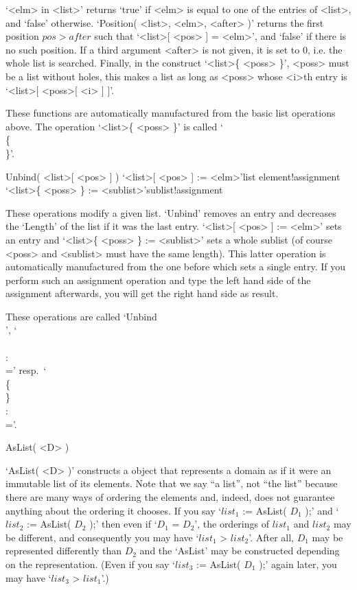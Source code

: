 `<elm> in <list>' returns `true' if <elm> is equal to  one of the entries
of  <list>, and `false'  otherwise. `Position( <list>,  <elm>, <after> )'
returns the first position $pos  > after$  such  that `<list>[ <pos> ]  =
<elm>', and `false' if  there is no  such  position. If a third  argument
<after> is  not given, it is  set to 0, i.e.  the whole list is searched.
Finally, in  the construct `<list>\{  <poss> \}',  <poss> must  be a list
without holes, this makes a  list as long as <poss>  whose <i>th entry is
`<list>[ <poss>[ <i> ] ]'.

These  functions  are automatically  manufactured    from the basic  list
operations   above.  The  operation  `<list>\{    <poss>  \}' is   called
`\\\{\\\}'.

\>Unbind( <list>[ <pos> ] )
\>`<list>[ <pos> ] := <elm>'{list element!assignment}
\>`<list>\{ <poss> \} := <sublist>'{sublist!assignment}

These   operations modify a  given  list.  `Unbind'  removes an entry and
decreases  the `Length' of the list  if it was  the  last entry. `<list>[
<pos> ]  := <elm>' sets an  entry  and `<list>\{ <poss> \}  := <sublist>'
sets a whole sublist  (of course <poss> and <sublist>  must have the same
length). This latter operation is automatically manufactured from the one
before  which sets a  single entry.  If  you  perform such an  assignment
operation and type  the left hand side of  the assignment afterwards, you
will get the right hand side as result.

These     operations      are    called   `Unbind\\[\\]',  `\\[\\]\\:\\='
resp.~`\\\{\\\}\\:\\='.

\null

\>AsList( <D> )

`AsList( <D> )' constructs a {\GAP} object that represents a domain as if
it were an  immutable list of its elements.  Note that we say ``a list'',
not ``the list''  because there are  many  ways of ordering  the elements
and, indeed, {\GAP} does  not  guarantee anything  about the  ordering it
chooses. If  you  say `$list_1$ := AsList(  $D_1$   );' and `$list_2$  :=
AsList( $D_2$ );' then even if `$D_1$ = $D_2$', the orderings of $list_1$
and $list_2$ may be different,  and consequently  you may have  `$list_1$
\<> $list_2$'. After all, $D_1$ may be represented differently than $D_2$
and the `AsList' may  be   constructed depending on  the  representation.
(Even if you say `$list_3$ := AsList( $D_1$ );' again later, you may have
`$list_3$ \<> $list_1$'.)

